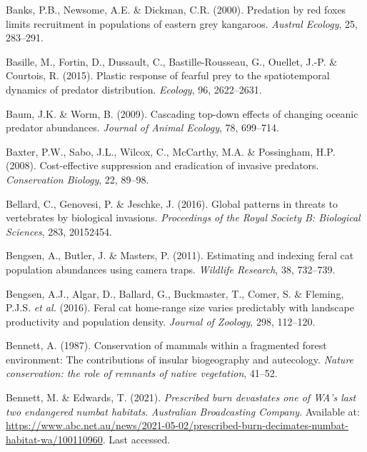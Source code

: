 \documentclass[11pt,a4paper,titlepage,twoside,openright]{style/unimelbthesis}
\begin{document}
\begin{mainmatter}
\leavevmode\hypertarget{ref-banks2000predation}{}%
Banks, P.B., Newsome, A.E. \& Dickman, C.R. (2000). Predation by red foxes limits recruitment in populations of eastern grey kangaroos. \emph{Austral Ecology}, 25, 283--291.

\leavevmode\hypertarget{ref-basille2015plastic}{}%
Basille, M., Fortin, D., Dussault, C., Bastille-Rousseau, G., Ouellet, J.-P. \& Courtois, R. (2015). Plastic response of fearful prey to the spatiotemporal dynamics of predator distribution. \emph{Ecology}, 96, 2622--2631.

\leavevmode\hypertarget{ref-baum2009cascading}{}%
Baum, J.K. \& Worm, B. (2009). Cascading top-down effects of changing oceanic predator abundances. \emph{Journal of Animal Ecology}, 78, 699--714.

\leavevmode\hypertarget{ref-baxter2008cost}{}%
Baxter, P.W., Sabo, J.L., Wilcox, C., McCarthy, M.A. \& Possingham, H.P. (2008). Cost-effective suppression and eradication of invasive predators. \emph{Conservation Biology}, 22, 89--98.

\leavevmode\hypertarget{ref-bellard2016global}{}%
Bellard, C., Genovesi, P. \& Jeschke, J. (2016). Global patterns in threats to vertebrates by biological invasions. \emph{Proceedings of the Royal Society B: Biological Sciences}, 283, 20152454.

\leavevmode\hypertarget{ref-bengsen2011estimating}{}%
Bengsen, A., Butler, J. \& Masters, P. (2011). Estimating and indexing feral cat population abundances using camera traps. \emph{Wildlife Research}, 38, 732--739.

\leavevmode\hypertarget{ref-bengsen2016feral}{}%
Bengsen, A.J., Algar, D., Ballard, G., Buckmaster, T., Comer, S. \& Fleming, P.J.S. \emph{et al.} (2016). Feral cat home-range size varies predictably with landscape productivity and population density. \emph{Journal of Zoology}, 298, 112--120.

\leavevmode\hypertarget{ref-bennett1987conservation}{}%
Bennett, A. (1987). Conservation of mammals within a fragmented forest environment: The contributions of insular biogeography and autecology. \emph{Nature conservation: the role of remnants of native vegetation}, 41--52.

\leavevmode\hypertarget{ref-bennett2021prescribed}{}%
Bennett, M. \& Edwards, T. (2021). \emph{Prescribed burn devastates one of WA's last two endangered numbat habitats}. \emph{Australian Broadcasting Company}. Available at: \url{https://www.abc.net.au/news/2021-05-02/prescribed-burn-decimates-numbat-habitat-wa/100110960}. Last accessed.


\end{mainmatter}
\end{document}
